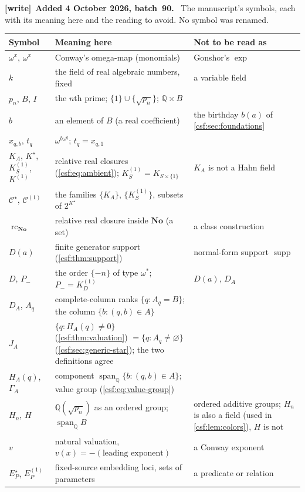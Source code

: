 \documentclass[11pt,a4paper]{article}
\numberwithin{equation}{section}
\theoremstyle{definition}
\theoremstyle{remark}
\newcommand{\Q}{\mathbb Q}
\newcommand{\No}{\mathbf{No}}
\newcommand{\rc}{\operatorname{rc}}
\newcommand{\supp}{\operatorname{supp}}
\newcommand{\Cstar}{\mathcal C^{\star}}
\newcommand{\Cone}{\mathcal C^{(1)}}
\newcommand{\Kstar}{K^{\star}}
\newcommand{\Kone}{K^{(1)}}
\newcommand{\e}[1]{\omega^{#1}}
\newenvironment{writenote}[1][]{\par\smallskip\begingroup\small\raggedright
 \setlength{\parindent}{1.25em}\noindent\textbf{[write]}\if\relax\detokenize{#1}\relax\else~\textbf{#1.}\fi\ }%
 {\par\endgroup\smallskip}
\begin{document}
\begin{writenote}[Added 4 October 2026, batch~90]
The manuscript's symbols, each with its meaning here and the reading to avoid. No symbol was renamed.
{\footnotesize
\begin{longtable}{P{0.2\textwidth}P{0.4\textwidth}P{0.3\textwidth}}
\toprule
Symbol & Meaning here & Not to be read as\\
\midrule
\endhead
$\omega^x$, $\e{x}$ & Conway's omega-map (monomials) & Gonshor's $\exp$\\
$k$ & the field of real algebraic numbers, fixed & a variable field\\
$p_n$, $B$, $I$ & the $n$th prime; $\{1\}\cup\{\sqrt{p_n}\}$; $\Q\times B$ & \\
$b$ & an element of $B$ (a real coefficient) & the birthday $b(a)$ of \cref{csf:sec:foundations}\\
$x_{q,b}$, $t_q$ & $\omega^{b\omega^q}$; $t_q=x_{q,1}$ & \\
$K_A$, $\Kstar$, $\Kone_S$, $\Kone$ & relative real closures (\cref{csf:eq:ambient}); $\Kone_S=K_{S\times\{1\}}$ & $K_A$ is not a Hahn field\\
$\Cstar$, $\Cone$ & the families $\{K_A\}$, $\{\Kone_S\}$, subsets of $2^{\Kstar}$ & \\
$\rc_{\No}$ & relative real closure inside $\No$ (a set) & a class construction\\
$D(a)$ & finite generator support (\cref{csf:thm:support}) & normal-form support $\supp$\\
$D$, $P_-$ & the order $\{-n\}$ of type $\omega^*$; $P_-=\Kone_D$ & $D(a)$, $D_A$\\
$D_A$, $A_q$ & complete-column ranks $\{q:A_q=B\}$; the column $\{b:(q,b)\in A\}$ & \\
$J_A$ & $\{q:H_A(q)\ne0\}$ (\cref{csf:thm:valuation}) $=\{q:A_q\ne\varnothing\}$ (\cref{csf:sec:generic-star}); the two definitions agree & \\
$H_A(q)$, $\Gamma_A$ & component $\operatorname{span}_\Q\{b:(q,b)\in A\}$; value group (\cref{csf:eq:value-group}) & \\
$H_n$, $H$ & $\Q(\sqrt{p_n})$ as an ordered group; $\operatorname{span}_\Q B$ & ordered additive groups; $H_n$ is also a field (used in \cref{csf:lem:colors}), $H$ is not\\
$v$ & natural valuation, $v(x)=-(\text{leading exponent})$ & a Conway exponent\\
$E^\star_P$, $E^{(1)}_P$ & fixed-source embedding loci, sets of parameters & a predicate or relation\\

\end{longtable}}
\end{writenote}
\end{document}
